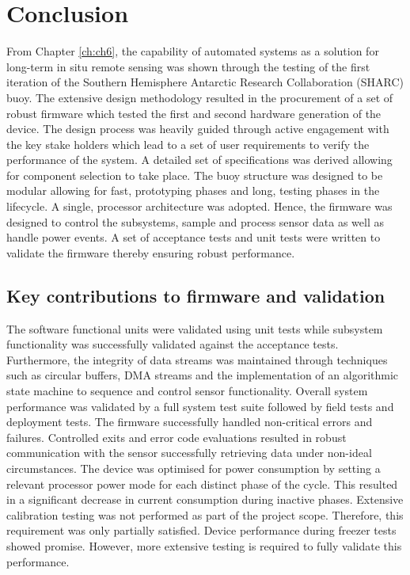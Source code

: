 

\chapter{Conclusion}
\label{ch:conclusion}
From Chapter \ref{ch:ch6}, the capability of automated systems as a solution for long-term in situ remote sensing was shown through the testing of the first iteration of the Southern Hemisphere Antarctic Research Collaboration (SHARC) buoy. The extensive design methodology resulted in the procurement of a set of robust firmware which tested the first and second hardware generation of the device. The design process was heavily guided through active engagement with the key stake holders which lead to a set of user requirements to verify the performance of the system. A detailed set of specifications was derived allowing for component selection to take place. The buoy structure was designed to be modular allowing for fast, prototyping phases and long, testing phases in the lifecycle. A single, processor architecture was adopted. Hence, the firmware was designed to control the subsystems, sample and process sensor data as well as handle power events. A set of acceptance tests and unit tests were written to validate the firmware thereby ensuring robust performance.

\section{Key contributions to firmware and validation}

The software functional units were validated using unit tests while subsystem functionality was successfully validated against the acceptance tests. Furthermore, the integrity of data streams was maintained through techniques such as circular buffers, DMA streams and the implementation of an algorithmic state machine to sequence and control sensor functionality. Overall system performance was validated by a full system test suite  followed by field tests and deployment tests. The firmware successfully handled non-critical errors and failures. Controlled exits and error code evaluations resulted in robust communication with the sensor successfully retrieving data under non-ideal circumstances. The device was optimised for power consumption by setting a relevant processor power mode for each distinct phase of the cycle. This resulted in a significant decrease in current consumption during inactive phases. Extensive calibration testing was not performed as part of the project scope. Therefore, this requirement was only partially satisfied. Device performance during freezer tests showed promise. However, more extensive testing is required to fully validate this performance.

